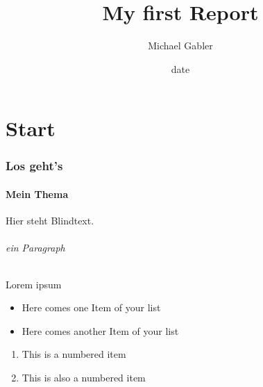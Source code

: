 \documentclass{article}
\begin{document}
	\author{Michael Gabler}
	\title{My first Report}
	\date{date}
	\maketitle
	
	\newpage
	
	\tableofcontents
	
	\newpage
	
	\part{Start}
	\section{Los geht's}
	\subsection{Mein Thema}
	Hier steht Blindtext.
	\paragraph{ein Paragraph}
	Lorem ipsum
	
	\begin{itemize}
		\item Here comes one Item of your list
		\item Here comes another Item of your list
	\end{itemize}

	\begin{enumerate}
		\item This is a numbered item
		\item This is also a numbered item
	\end{enumerate}
	
	
\end{document}
